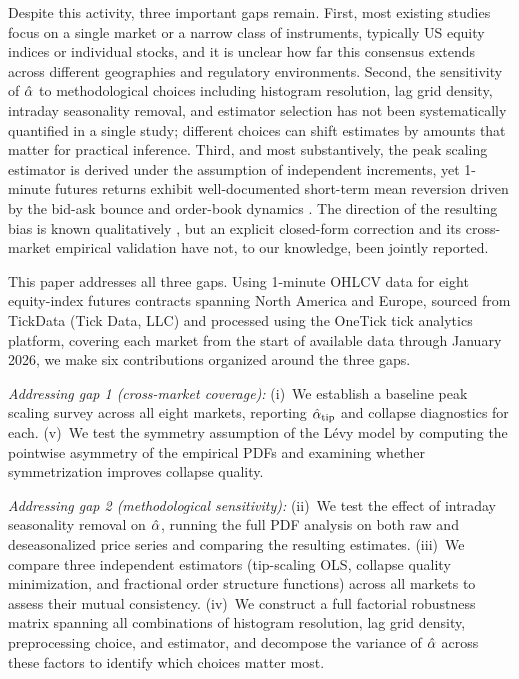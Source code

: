 \documentclass[12pt,a4paper]{article}
\begin{document}
Despite this activity, three important gaps remain. First, most existing
studies focus on a single market or a narrow class of instruments, typically
US equity indices or individual stocks, and it is unclear how far this consensus extends across different
geographies and regulatory environments. Second, the sensitivity of $\hat{\alpha}$ to methodological
choices including histogram resolution, lag grid density, intraday
seasonality removal, and estimator selection has not been systematically
quantified in a single study; different choices can shift estimates by
amounts that matter for practical inference. Third, and most substantively,
the peak scaling estimator is derived under the assumption of independent
increments, yet 1-minute futures returns exhibit well-documented short-term
mean reversion driven by the bid-ask bounce and order-book dynamics
\cite{Roll1984,Bouchaud2004}. The direction of the resulting bias is
known qualitatively \cite{BouchaudPotters2003}, but an explicit
closed-form correction and its cross-market empirical validation
have not, to our knowledge, been jointly reported.

This paper addresses all three gaps. Using 1-minute OHLCV data for eight
equity-index futures contracts spanning North America and Europe, sourced from
TickData (Tick Data, LLC) and processed using the OneTick tick analytics platform,
covering each market from the start of available data through
January 2026, we make six contributions organized around the three gaps.

\textit{Addressing gap 1 (cross-market coverage):}
(i)~We establish a baseline peak scaling survey across all eight markets,
reporting $\hat{\alpha}_{\mathrm{tip}}$ and collapse diagnostics for each.
(v)~We test the symmetry assumption of the Lévy model by computing the
pointwise asymmetry of the empirical PDFs and examining whether symmetrization
improves collapse quality.

\textit{Addressing gap 2 (methodological sensitivity):}
(ii)~We test the effect of intraday seasonality removal on $\hat{\alpha}$, running
the full PDF analysis on both raw and deseasonalized price series and
comparing the resulting estimates.
(iii)~We compare three independent estimators (tip-scaling OLS,
collapse quality minimization, and fractional order structure functions)
across all markets to assess their mutual consistency.
(iv)~We construct a full factorial robustness matrix spanning all combinations
of histogram resolution, lag grid density, preprocessing choice, and
estimator, and decompose the variance of $\hat{\alpha}$ across these factors to
identify which choices matter most.
\end{document}
